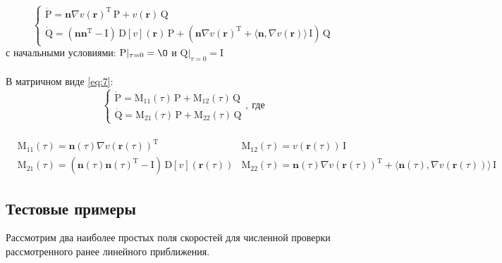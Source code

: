 \documentclass{article}
\newcommand{\bfv}[1]{\mathbf{#1}}
\newcommand{\dd}[1]{\dot{#1}}
\newcommand{\dv}[1]{\nabla v(#1)}
\newcommand{\ddv}[1]{\mathrm{D}[v](#1)}
\newcommand{\dprod}[2]{\langle #1, #2 \rangle}
\newcommand{\T}[1]{#1^\mathrm{T}}
\newcommand{\matr}[1]{\mathrm{#1}}
\begin{document}
\begin{equation} \label{eq:7}
\begin{cases}
\dd{\matr{P}} = \bfv{n}\T{\dv{\bfv{r}}}\,\matr{P} + v(\bfv{r})\,\matr{Q}\\
\dd{\matr{Q}} = (\bfv{n}\T{\bfv{n}} - \matr{I})\,\ddv{\bfv{r}}\,\matr{P} + (\bfv{n}\T{\dv{\bfv{r}}} + \dprod{\bfv{n}}{\dv{\bfv{r}}}\,\matr{I})\,\matr{Q} 
\end{cases}
\end{equation}
с начальными условиями: $\matr{P}|_{\tau=0} = \matr{\O}$ и $\matr{Q}|_{\tau=0} = \matr{I}$\\\\
\newpage
В матричном виде \eqref{eq:7}:
\begin{equation} \label{eq:8}
\begin{cases}
\dd{\matr{P}} = \matr{M}_{11}(\tau)\,\matr{P} + \matr{M}_{12}(\tau)\,\matr{Q}\\
\dd{\matr{Q}} = \matr{M}_{21}(\tau)\,\matr{P} + \matr{M}_{22}(\tau)\,\matr{Q} 
\end{cases}, \ \text{где}
\end{equation}\\
\begin{align*} 
&\matr{M}_{11}(\tau) = \bfv{n}(\tau)\T{\dv{\bfv{r}(\tau)}}&\matr{M}_{12}(\tau) = v(\bfv{r}(\tau))\,\matr{I}\\
&\matr{M}_{21}(\tau) = (\bfv{n}(\tau)\T{\bfv{n}(\tau)} - \matr{I})\,\ddv{\bfv{r}(\tau)}&\matr{M}_{22}(\tau) = \bfv{n}(\tau)\T{\dv{\bfv{r}(\tau)}} + \dprod{\bfv{n}(\tau)}{\dv{\bfv{r}(\tau)}}\,\matr{I}
\end{align*}

\subsection{Тестовые примеры}
Рассмотрим два наиболее простых поля скоростей для численной проверки рассмотренного ранее линейного приближения.
\end{document}
